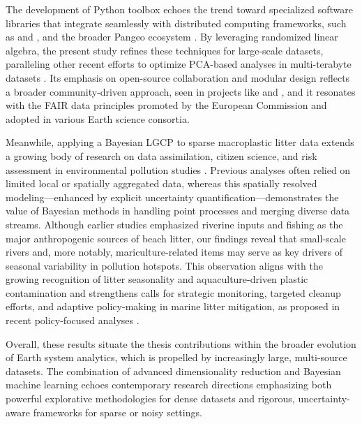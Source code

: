 The development of  Python toolbox echoes the trend toward specialized software libraries that integrate seamlessly with distributed computing frameworks, such as  and , and the broader Pangeo ecosystem \cite{pangeo}. By leveraging randomized linear algebra, the present study refines these techniques for large-scale datasets, paralleling other recent efforts to optimize PCA-based analyses in multi-terabyte datasets \cite[e.g.][]{velegar_scalable_2019,erichson_sparse_2020}. Its emphasis on open-source collaboration and modular design reflects a broader community-driven approach, seen in projects like  and , and it resonates with the FAIR data principles \cite{wilkinson_fair_2016} promoted by the European Commission and adopted in various Earth science consortia.

Meanwhile, applying a Bayesian LGCP to sparse macroplastic litter data extends a growing body of research on data assimilation, citizen science, and risk assessment in environmental pollution studies \cite[e.g.][]{datta_nonseparable_2016,thiel_impacts_2018,locritani_assessing_2019,chenet_plastic_2021,zorzo_approach_2021,haarr_global_2022}. Previous analyses often relied on limited local or spatially aggregated data, whereas this spatially resolved modeling---enhanced by explicit uncertainty quantification---demonstrates the value of Bayesian methods in handling point processes and merging diverse data streams. Although earlier studies emphasized riverine inputs and fishing as the major anthropogenic sources of beach litter, our findings reveal that small-scale rivers and, more notably, mariculture-related items may serve as key drivers of seasonal variability in pollution hotspots. This observation aligns with the growing recognition of litter seasonality and aquaculture-driven plastic contamination \cite{skirtun_plastic_2022,ruangpanupan_seasonal_2023,xu_seasonality_2024,cozar_proof_2024} and strengthens calls for strategic monitoring, targeted cleanup efforts, and adaptive policy-making in marine litter mitigation, as proposed in recent policy-focused analyses \cite{ospar_comission_feeder_2021, hipolito_policy_2020}.

Overall, these results situate the thesis contributions within the broader evolution of Earth system analytics, which is propelled by increasingly large, multi-source datasets. The combination of advanced dimensionality reduction and Bayesian machine learning echoes contemporary research directions emphasizing both powerful explorative methodologies for dense datasets and rigorous, uncertainty-aware frameworks for sparse or noisy settings.


